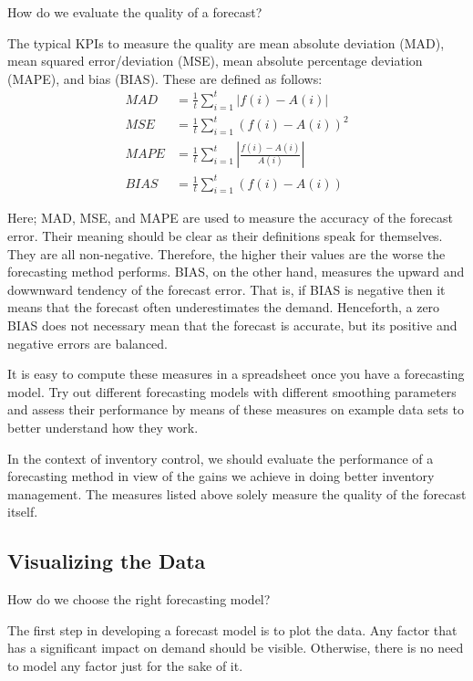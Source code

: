 \begin{exercise}
How do we evaluate the quality of a forecast?


\begin{solution}
The typical KPIs to measure the quality are mean absolute deviation (MAD), mean squared error/deviation (MSE), mean absolute percentage deviation (MAPE), and bias (BIAS). These are defined as follows:
\begin{align*}
MAD & = \frac{1}{t} \sum_{i=1}^t|f(i)-A(i)| \\
MSE & = \frac{1}{t} \sum_{i=1}^t(f(i)-A(i))^2 \\
MAPE & = \frac{1}{t} \sum_{i=1}^t \left|\frac{f(i)-A(i)}{A(i)}\right| \\
BIAS & = \frac{1}{t} \sum_{i=1}^t(f(i)-A(i))
\end{align*}

Here; MAD, MSE, and MAPE are used to measure the accuracy of the forecast error. Their meaning should be clear as their definitions speak for themselves. They are all non-negative. Therefore, the higher their values are the worse the forecasting method performs. BIAS, on the other hand, measures the upward and dowwnward tendency of the forecast error. That is, if BIAS is negative then it means that the forecast often underestimates the demand. Henceforth, a zero BIAS does not necessary mean that the forecast is accurate, but its positive and negative errors are balanced. 

It is easy to compute these measures in a spreadsheet once you have a forecasting model. Try out different forecasting models with different smoothing parameters and assess their performance by means of these measures on example data sets to better understand how they work.

In the context of inventory control, we should evaluate the performance of a forecasting method in view of the gains we achieve in doing better inventory management. The measures listed above solely measure the quality of the forecast itself.
  \end{solution}
\end{exercise}



\subsection{Visualizing the Data}

\begin{exercise}
How do we choose the right forecasting model?


  \begin{solution}
The first step in developing a forecast model is to plot the data. Any factor that has a significant impact on demand should be visible. Otherwise, there is no need to model any factor just for the sake of it. 
  \end{solution}
\end{exercise}


